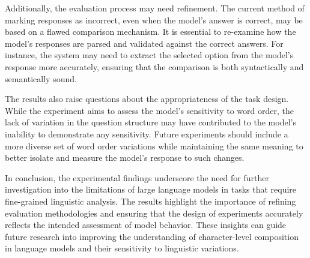 \documentclass{article}
\begin{document}
Additionally, the evaluation process may need refinement. The current method of marking responses as incorrect, even when the model's answer is correct, may be based on a flawed comparison mechanism. It is essential to re-examine how the model's responses are parsed and validated against the correct answers. For instance, the system may need to extract the selected option from the model's response more accurately, ensuring that the comparison is both syntactically and semantically sound.

The results also raise questions about the appropriateness of the task design. While the experiment aims to assess the model's sensitivity to word order, the lack of variation in the question structure may have contributed to the model's inability to demonstrate any sensitivity. Future experiments should include a more diverse set of word order variations while maintaining the same meaning to better isolate and measure the model's response to such changes.

In conclusion, the experimental findings underscore the need for further investigation into the limitations of large language models in tasks that require fine-grained linguistic analysis. The results highlight the importance of refining evaluation methodologies and ensuring that the design of experiments accurately reflects the intended assessment of model behavior. These insights can guide future research into improving the understanding of character-level composition in language models and their sensitivity to linguistic variations.
\end{document}
